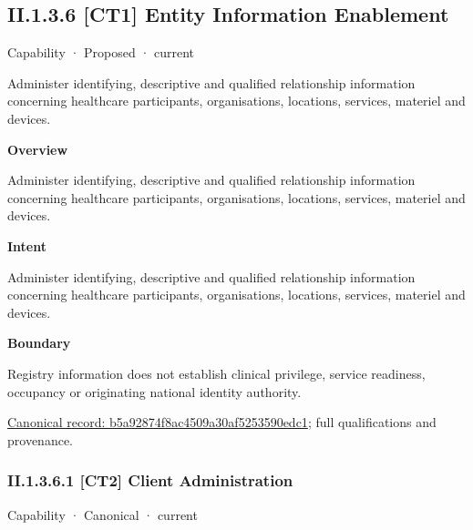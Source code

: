 \subsection*{II.1.3.6 [CT1] Entity Information Enablement}
\label{navigation:II.1.3.6}

\label{element:b5a92874f8ac4509a30af5253590edc1}
{\small Capability · Proposed · current}\par

Administer identifying, descriptive and qualified relationship information concerning healthcare participants, organisations, locations, services, materiel and devices.



\textbf{Overview}



Administer identifying, descriptive and qualified relationship information concerning healthcare participants, organisations, locations, services, materiel and devices.



\textbf{Intent}



Administer identifying, descriptive and qualified relationship information concerning healthcare participants, organisations, locations, services, materiel and devices.



\textbf{Boundary}



Registry information does not establish clinical privilege, service readiness, occupancy or originating national identity authority.


{\footnotesize \href{../../../../continuum/strategy/capability/b5a92874f8ac4509a30af5253590edc1.md}{Canonical record: b5a92874f8ac4509a30af5253590edc1}; full qualifications and provenance.}\par
\subsubsection*{II.1.3.6.1 [CT2] Client Administration}
\label{navigation:II.1.3.6.1}

\label{element:f0885472cced4bccbcce1568bf0360dc}
{\small Capability · Canonical · current}\par

